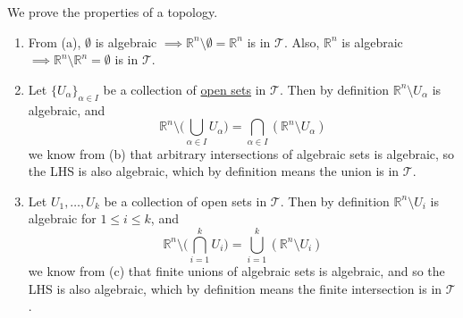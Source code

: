   \begin{solution}[d] 
    We prove the properties of a topology. 
    \begin{enumerate}
      \item From (a), $\emptyset$ is algebraic $\implies \mathbb{R}^n \setminus \emptyset = \mathbb{R}^n$ is in $\mathscr{T}$. Also, $\mathbb{R}^n$ is algebraic $\implies \mathbb{R}^n \setminus \mathbb{R}^n = \emptyset$ is in $\mathscr{T}$.  

      \item Let $\{U_\alpha\}_{\alpha \in I}$ be a collection of \hyperref[def:open-set]{open sets} in $\mathscr{T}$. Then by definition $\mathbb{R}^n \setminus U_\alpha$ is algebraic, and 
      \begin{equation}
        \mathbb{R}^n \setminus \bigg( \bigcup_{\alpha \in I} U_\alpha \bigg) = \bigcap_{\alpha \in I} (\mathbb{R}^n \setminus U_\alpha) 
      \end{equation} 
      we know from (b) that arbitrary intersections of algebraic sets is algebraic, so the LHS is also algebraic, which by definition means the union is in $\mathscr{T}$. 

      \item Let $U_1, \ldots, U_k$ be a collection of open sets in $\mathscr{T}$. Then by definition $\mathbb{R}^n \setminus U_i$ is algebraic for $1 \leq i \leq k$, and  
      \begin{equation}
        \mathbb{R}^n \setminus \bigg( \bigcap_{i=1}^k U_i \bigg) = \bigcup_{i=1}^k (\mathbb{R}^n \setminus U_i)
      \end{equation}
      we know from (c) that finite unions of algebraic sets is algebraic, and so the LHS is also algebraic, which by definition means the finite intersection is in $\mathscr{T}$. 
    \end{enumerate}
  \end{solution}
